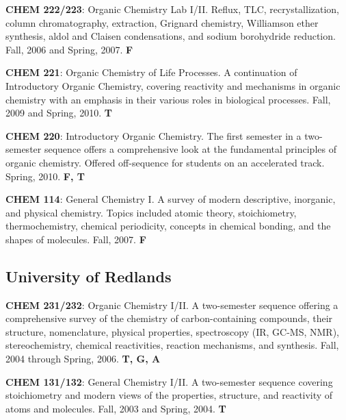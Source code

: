 \documentclass[10pt]{article}
\newcommand*\teitem[4]{\textbf{#1}: #2 #3 \textbf{#4}}
\begin{document}
\teitem{CHEM 222/223}{Organic Chemistry Lab I/II. Reflux, TLC, recrystallization, column chromatography, extraction, Grignard chemistry, Williamson ether synthesis, aldol and Claisen condensations, and sodium borohydride reduction.}{Fall, 2006 and Spring, 2007.}{F}

\teitem{CHEM 221}{Organic Chemistry of Life Processes. A continuation of  Introductory Organic Chemistry, covering reactivity and mechanisms in organic chemistry with an emphasis in their various roles in biological processes.}{Fall, 2009 and Spring, 2010.}{T}

\teitem{CHEM 220}{Introductory Organic Chemistry. The first semester in a two-semester sequence offers a comprehensive look at the fundamental principles of organic chemistry. Offered off-sequence for students on an accelerated track.}{Spring, 2010.}{F, T}

\teitem{CHEM 114}{General Chemistry I. A survey of modern descriptive, inorganic, and physical chemistry. Topics included atomic theory, stoichiometry, thermochemistry, chemical periodicity, concepts in chemical bonding, and the shapes of molecules.}{Fall, 2007.}{F}


\subsection{University of Redlands}


\teitem{CHEM 231/232}{Organic Chemistry I/II. A two-semester sequence offering a comprehensive survey of the chemistry of carbon-containing compounds, their structure, nomenclature, physical properties, spectroscopy (IR, GC-MS, NMR), stereochemistry, chemical reactivities, reaction mechanisms, and synthesis.}{Fall, 2004 through Spring, 2006.}{T, G, A}

\teitem{CHEM 131/132}{General Chemistry I/II.  A two-semester sequence covering stoichiometry and modern views of the properties, structure, and reactivity of atoms and molecules.}{Fall, 2003 and Spring, 2004.}{T}
\end{document}
